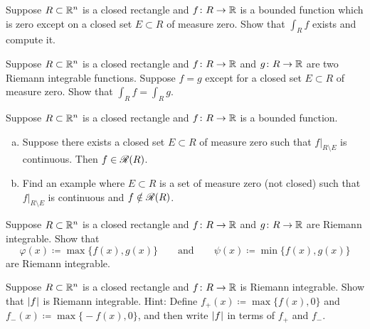 \begin{exercise}
Suppose $R \subset {\mathbb{R}}^n$ is a closed rectangle and
$f \colon R \to {\mathbb{R}}$ is a bounded function which is zero except on a closed set $E
\subset R$ of measure
zero.  Show that $\int_R f$ exists and compute it.
\end{exercise}

\begin{exercise}
Suppose $R \subset {\mathbb{R}}^n$ is a closed rectangle and
$f \colon R \to {\mathbb{R}}$ and
$g \colon R \to {\mathbb{R}}$ are two Riemann integrable functions.  Suppose $f = g$
except for a closed set $E \subset R$ of measure zero.  Show that $\int_R f = \int_R g$.
\end{exercise}

\begin{samepage}
\begin{exercise}
Suppose $R \subset {\mathbb{R}}^n$ is a closed rectangle and
$f \colon R \to {\mathbb{R}}$ is a bounded function.
\begin{enumerate}[a)]
\item
Suppose there exists a closed set $E \subset R$ of measure zero such that
$f|_{R\setminus E}$ is continuous.  Then $f \in {\mathscr{R}}(R)$.
\item
Find an example where $E \subset R$ is a set of measure zero
(not closed) such that
$f|_{R\setminus E}$ is continuous and $f \notin {\mathscr{R}}(R)$.
\end{enumerate}
\end{exercise}
\end{samepage}

\begin{exercise}
Suppose $R \subset {\mathbb{R}}^n$ is a closed rectangle
and $f \colon R \to {\mathbb{R}}$ and $g \colon R \to {\mathbb{R}}$ 
are Riemann integrable.
Show that
\begin{equation*}
\varphi(x) \coloneqq \max \bigl\{ f(x) , g(x) \bigr\}
\qquad
\text{and}
\qquad
\psi(x) \coloneqq \min \bigl\{ f(x) , g(x) \bigr\}
\end{equation*}
are Riemann integrable.
\end{exercise}

\begin{exercise}
Suppose $R \subset {\mathbb{R}}^n$ is a closed rectangle
and $f \colon R \to {\mathbb{R}}$ is Riemann integrable.
Show that $\lvert {f} \rvert$ is Riemann integrable.
Hint: Define
$f_+(x) \coloneqq \max \bigl\{ f(x) , 0 \bigr\}$ and
$f_-(x) \coloneqq \max \bigl\{ -f(x) , 0 \bigr\}$, and then write $\lvert {f} \rvert$
in terms of $f_+$ and $f_-$.
\end{exercise}

